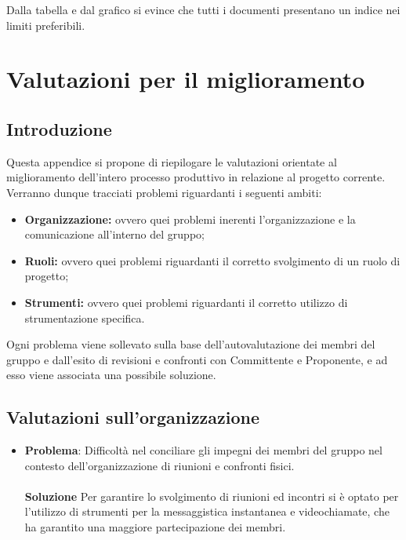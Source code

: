 \documentclass[openany,12pt,a4paper]{report}
\begin{document}
\begin{itemize}
	Dalla tabella e dal grafico si evince che tutti i documenti presentano un indice nei limiti preferibili.	
\end{itemize}


\chapter{Valutazioni per il miglioramento}

\section{Introduzione}

Questa appendice si propone di riepilogare le valutazioni orientate al miglioramento dell'intero processo produttivo in relazione al progetto corrente. Verranno dunque tracciati problemi riguardanti i seguenti ambiti:

\begin{itemize}
	\item \textbf{Organizzazione:} ovvero quei problemi inerenti l'organizzazione e la comunicazione all'interno del gruppo;
	\item \textbf{Ruoli:} ovvero quei problemi riguardanti il corretto svolgimento di un ruolo di progetto;
	\item \textbf{Strumenti:} ovvero quei problemi riguardanti il corretto utilizzo di strumentazione specifica.
\end{itemize}

\noindent Ogni problema viene sollevato sulla base dell'autovalutazione dei membri del gruppo e dall'esito di revisioni e confronti con Committente e Proponente, e ad esso viene associata una possibile soluzione.

\section{Valutazioni sull'organizzazione}
\begin{itemize}
	\item \textbf{Problema}: Difficoltà nel conciliare gli impegni dei membri del gruppo nel contesto dell'organizzazione di riunioni e confronti fisici. \\ \\
	\textbf{Soluzione} Per garantire lo svolgimento di riunioni ed incontri si è optato per l'utilizzo di strumenti per la messaggistica instantanea e videochiamate, che ha garantito una maggiore partecipazione dei membri.
\end{itemize}
\end{document}
